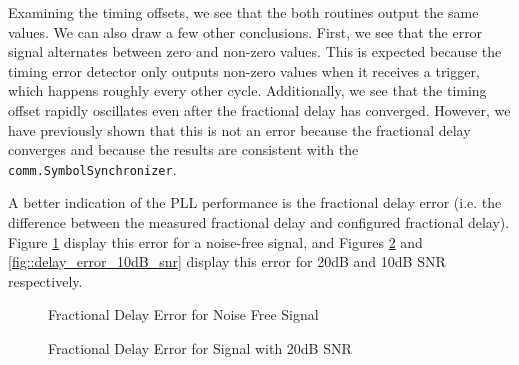 \documentclass{article}
\begin{document}
\noindent Examining the timing offsets, we see that the both routines output the same values. We can also draw a few other conclusions. First, we see that the error signal alternates between zero and non-zero values. This is expected because the timing error detector only outputs non-zero values when it receives a trigger, which happens roughly every other cycle. Additionally, we see that the timing offset rapidly oscillates even after the fractional delay has converged. However, we have previously shown that this is not an error because the fractional delay converges and because the results are consistent with the \texttt{comm.SymbolSynchronizer}.

A better indication of the PLL performance is the fractional delay error (i.e. the difference between the measured fractional delay and configured fractional delay). Figure \ref{fig::delay_error_no_noise} display this error for a noise-free signal, and Figures \ref{fig::delay_error_20dB_snr} and \ref{fig::delay_error_10dB_snr} display this error for 20dB and 10dB SNR respectively. 

\begin{figure}[H]
	\centerline{}
	\caption{Fractional Delay Error for Noise Free Signal}
	\label{fig::delay_error_no_noise}
\end{figure}

\begin{figure}[H]
	\centerline{}
	\caption{Fractional Delay Error for Signal with 20dB SNR}
	\label{fig::delay_error_20dB_snr}
\end{figure}
\end{document}
